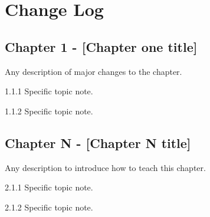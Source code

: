 \documentclass[../workbook]{subfiles}
\begin{document}

\section*{Change Log}


\subsection*{Chapter 1 - [Chapter one title]}

\par{
    Any description of major changes to the chapter.
}


\begin{bullets}
    \item 1.1.1 Specific topic note.
    \item 1.1.2 Specific topic note.
\end{bullets}


\subsection*{Chapter N - [Chapter N title]}

\par{
    Any description to introduce how to teach this chapter.
}


\begin{bullets}
    \item 2.1.1 Specific topic note.
    \item 2.1.2 Specific topic note.
\end{bullets}
\end{document}
